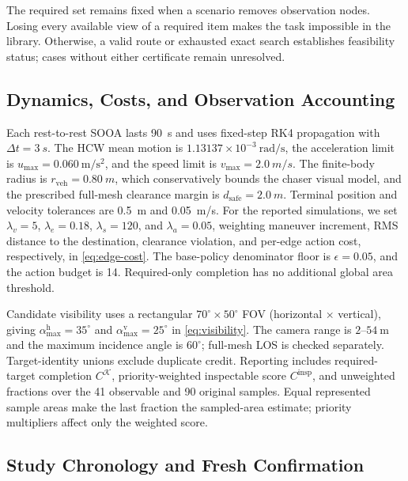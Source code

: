 \documentclass{IEEEtaes}
\newcommand{\dt}{\Delta t}
\newcommand{\unit}[2]{#1~#2}
\begin{document}
The required set remains fixed when a scenario removes observation nodes. Losing every available view of a required item makes the task impossible in the library. Otherwise, a valid route or exhausted exact search establishes feasibility status; cases without either certificate remain unresolved.

\subsection{Dynamics, Costs, and Observation Accounting}

Each rest-to-rest SOOA lasts \unit{90}{s} and uses fixed-step RK4 propagation with $\dt=\unit{3}{s}$. The HCW mean motion is $1.13137\times10^{-3}~\mathrm{rad/s}$, the acceleration limit is $u_{\max}=0.060~\mathrm{m/s^2}$, and the speed limit is $v_{\max}=\unit{2.0}{m/s}$. The finite-body radius is $r_{\mathrm{veh}}=\unit{0.80}{m}$, which conservatively bounds the chaser visual model, and the prescribed full-mesh clearance margin is $d_{\mathrm{safe}}=\unit{2.0}{m}$. Terminal position and velocity tolerances are \unit{0.5}{m} and \unit{0.05}{m/s}. For the reported simulations, we set $\lambda_{v}=5$, $\lambda_{e}=0.18$, $\lambda_{s}=120$, and $\lambda_{a}=0.05$, weighting maneuver increment, RMS distance to the destination, clearance violation, and per-edge action cost, respectively, in \eqref{eq:edge-cost}. The base-policy denominator floor is $\epsilon=0.05$, and the action budget is 14. Required-only completion has no additional global area threshold.

Candidate visibility uses a rectangular $70^{\circ}\times50^{\circ}$ FOV (horizontal $\times$ vertical), giving $\alpha_{\max}^{\mathrm h}=35^{\circ}$ and $\alpha_{\max}^{\mathrm v}=25^{\circ}$ in \eqref{eq:visibility}. The camera range is $2$--$54~\mathrm{m}$ and the maximum incidence angle is $60^{\circ}$; full-mesh LOS is checked separately. Target-identity unions exclude duplicate credit. Reporting includes required-target completion $C^{\mathcal K}$, priority-weighted inspectable score $C^{\mathrm{insp}}$, and unweighted fractions over the 41 observable and 90 original samples. Equal represented sample areas make the last fraction the sampled-area estimate; priority multipliers affect only the weighted score.

\subsection{Study Chronology and Fresh Confirmation}
\end{document}
